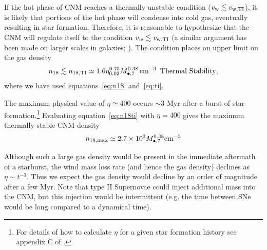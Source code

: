 \documentclass[usenatbib,fleqn]{mnras}
\newcommand{\Mbh}[1][]{M_{\bullet#1}}
\begin{document}
If the hot phase of CNM reaches a thermally unstable condition
($v_{\rm w} \lesssim v_{\rm w,TI}$), it is likely that portions of the
hot phase will condense into cold gas, eventually resulting in star
formation.  Therefore, it is reasonable to hypothesize that the CNM
will regulate itself to the condition $v_w \lesssim v_{\rm w,TI}$ (a
similar argument has been made on larger scales in galaxies;
\citealt{Voit+2015}).  The condition places an upper limit on the gas
density
\begin{equation}
n_{18} \lesssim n_{\rm 18,TI}\simeq 1.6 \eta_{0.02}^{0.75} \Mbh[,7]^{0.38} \, {\rm cm^{-3}}\,\,\,\text{Thermal Stability}
\label{eq:n18ti},
\end{equation}
where we have used equations~\eqref{eq:n18} and~\eqref{eq:ti}.

The maximum physical value of $\eta\simeq 400$ occurs $\sim 3$ Myr after a burst of star formation.\footnote{For details
  of how to calculate $\eta$ for a given star formation history see
  appendix C of \citet{Generozov+2015}.}  Evaluating equation~\eqref{eq:n18ti} with
$\eta=400$ gives the maximum thermally-stable CNM density
\begin{equation}
n_{\rm 18,max} \simeq 2.7\times 10^{3} \Mbh[,7]^{0.38} {\rm cm^{-3}}
\label{eq:n18max}
\end{equation}

Although such a large gas density would be present in the immediate
aftermath of a starburst, the wind mass loss rate (and hence the gas
density) declines as $\eta \sim t^{-3}$. Thus we expect the gas
density would decline by an order of magnitude after a few Myr. Note
that type II Supernovae could inject additional mass into the CNM, but
this injection would be intermittent (e.g. the time between SNe would
be long compared to a dynamical time).

\end{document}
